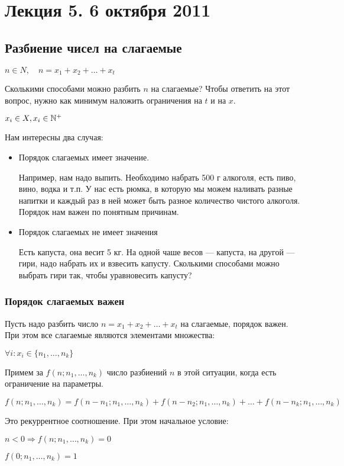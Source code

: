 \chapter{Лекция 5. 6 октября 2011}


\section{Разбиение чисел на слагаемые}

$n \in N, \quad  n = x_1 + x_2 + \dots + x_t$

Сколькими способами можно разбить $n$ на слагаемые? Чтобы ответить на этот вопрос, нужно как минимум наложить ограничения на $t$ и на $x$.
 

$x_i \in X, x_i \in \mathbb{N}^{+}$

Нам интересны два случая:
\begin{itemize}
\item Порядок слагаемых имеет значение. 
\begin{example}
Например, нам надо выпить. Необходимо набрать 500 г алкоголя, есть пиво, вино, водка и т.п. У нас есть рюмка, в которую мы можем наливать разные напитки и каждый раз в ней может быть разное количество чистого алкоголя. Порядок нам важен по понятным причинам.
\end{example}
 
\item Порядок слагаемых не имеет значения
\begin{example}
Есть капуста, она весит 5 кг. На одной чаше весов --- капуста, на другой --- гири, надо набрать их и взвесить капусту.
Сколькими способами можно выбрать гири так, чтобы уравновесить капусту?
\end{example}
 
\end{itemize}

 \subsection {Порядок слагаемых важен}
Пусть надо разбить число $n = x_1 + x_2 + \dots + x_t$ на слагаемые, порядок важен. При этом все слагаемые являются элементами множества:

$\forall i : x_i \in \{n_1, \dots, n_k\} $

Примем за $f(n; n_1, \dots, n_k)$  число разбиений $n$ в этой ситуации, когда есть ограничение на параметры. 

\begin{thm}
\[ 
f(n; n_1, \dots, n_k) = f(n-n_1; n_1, \dots, n_k) + f(n-n_2; n_1, \dots, n_k) + \dots + f(n-n_k; n_1, \dots, n_k)
\]

Это рекуррентное соотношение. При этом начальное условие:

$n < 0 \Rightarrow f(n; n_1, \dots, n_k) = 0$

$f(0; n_1, \dots, n_k) = 1$
\end{thm}

